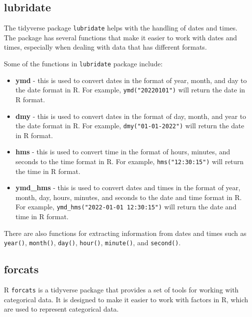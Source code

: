 \documentclass[
]{book}
\providecommand{\tightlist}{%
  \setlength{\itemsep}{0pt}\setlength{\parskip}{0pt}}
\begin{document}
\hypertarget{lubridate}{%
\subsection*{lubridate}\label{lubridate}}

The tidyverse package \texttt{lubridate} helps with the handling of dates and times. The package has several functions that make it easier to work with dates and times, especially when dealing with data that has different formats.

Some of the functions in \texttt{lubridate} package include:

\begin{itemize}
\tightlist
\item
  \textbf{ymd} - this is used to convert dates in the format of year, month, and day to the date format in R. For example, \texttt{ymd("20220101")} will return the date in R format.
\item
  \textbf{dmy} - this is used to convert dates in the format of day, month, and year to the date format in R. For example, \texttt{dmy("01-01-2022")} will return the date in R format.
\item
  \textbf{hms} - this is used to convert time in the format of hours, minutes, and seconds to the time format in R. For example, \texttt{hms("12:30:15")} will return the time in R format.
\item
  \textbf{ymd\_hms} - this is used to convert dates and times in the format of year, month, day, hours, minutes, and seconds to the date and time format in R. For example, \texttt{ymd\_hms("2022-01-01\ 12:30:15")} will return the date and time in R format.
\end{itemize}

There are also functions for extracting information from dates and times such as \texttt{year()}, \texttt{month()}, \texttt{day()}, \texttt{hour()}, \texttt{minute()}, and \texttt{second()}.

\hypertarget{forcats}{%
\subsection*{forcats}\label{forcats}}

R \texttt{forcats} is a tidyverse package that provides a set of tools for working with categorical data. It is designed to make it easier to work with factors in R, which are used to represent categorical data.
\end{document}

